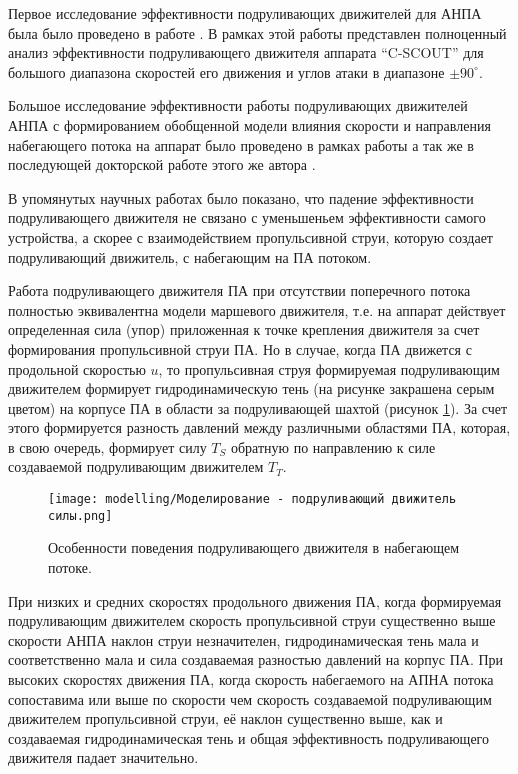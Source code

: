 Первое исследование эффективности подруливающих движителей для АНПА была было проведено в работе \cite{saunders2002effect}. 
В рамках этой работы представлен полноценный анализ эффективности подруливающего движителя аппарата ``C-SCOUT'' для большого диапазона скоростей его движения и углов атаки в диапазоне $\pm90^{\circ}$.

Большое исследование эффективности работы подруливающих движителей АНПА с формированием обобщенной модели влияния скорости и направления набегающего потока на аппарат было проведено в рамках работы \cite{palmer2008modelling} а так же в последующей докторской работе этого же автора \cite{palmer2009analysis}.

В упомянутых научных работах было показано, что падение эффективности подруливающего движителя не связано с уменьшеньем эффективности самого устройства, а скорее с взаимодействием пропульсивной струи, которую создает подруливающий движитель, с набегающим на ПА потоком.

Работа подруливающего движителя ПА при отсутствии поперечного потока полностью эквивалентна модели маршевого движителя, т.е. на аппарат действует определенная сила (упор) приложенная к точке крепления движителя за счет формирования пропульсивной струи ПА.
Но в случае, когда ПА движется с продольной скоростью $u$, то пропульсивная струя формируемая подруливающим движителем формирует гидродинамическую тень (на рисунке закрашена серым цветом) на корпусе ПА в области за подруливающей шахтой (рисунок \ref{fig:modelling-tunnel}).
За счет этого формируется разность давлений между различными областями ПА, которая, в свою очередь, формирует силу $T_S$ обратную по направлению к силе создаваемой подруливающим движителем $T_T$.

\begin{figure}[ht]
    \centering
    \texttt{[image: modelling/Моделирование - подруливающий движитель силы.png]}
    \caption{Особенности поведения подруливающего движителя в набегающем потоке.}
    \label{fig:modelling-tunnel}
\end{figure}

При низких и средних скоростях продольного движения ПА, когда формируемая подруливающим движителем скорость пропульсивной струи существенно выше скорости АНПА наклон струи незначителен, гидродинамическая тень мала и соответственно мала и сила создаваемая разностью давлений на корпус ПА.
При высоких скоростях движения ПА, когда скорость набегаемого на АПНА потока сопоставима или выше по скорости чем скорость создаваемой подруливающим движителем пропульсивной струи, её наклон существенно выше, как и создаваемая гидродинамическая тень и общая эффективность подруливающего движителя падает значительно.

